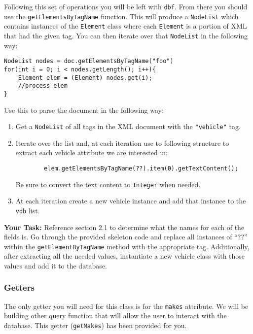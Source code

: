 Following this set of operations you will be left with \lstinline|dbf|. From there
you should use the \lstinline|getElementsByTagName| function. This will produce 
a \lstinline|NodeList| which contains instances of the \lstinline|Element| class
where each \lstinline|Element| is a portion of XML that had the given tag. You
can then iterate over that \lstinline|NodeList| in the following way:

\begin{lstlisting}[frame=trBL, basicstyle=\fontnotesize]
NodeList nodes = doc.getElementsByTagName("foo")
for(int i = 0; i < nodes.getLength(); i++){
    Element elem = (Element) nodes.get(i);
    //process elem
}
\end{lstlisting}

\newpage
Use this to parse the document in the following way:
\begin{enumerate}
    \item Get a \lstinline|NodeList| of all tags in the XML document with the \lstinline|"vehicle"| tag.
    \item Iterate over the list and, at each iteration use to following structure to extract each vehicle attribute we are interested in:
        \begin{lstlisting}
        elem.getElementsByTagName(??).item(0).getTextContent();
        \end{lstlisting}
        Be sure to convert the text content to \lstinline|Integer| when needed.
    \item At each iteration create a new vehicle instance and add that instance to the \lstinline|vdb| list.
\end{enumerate}

\textbf{Your Task:} Reference section 2.1 to determine what the names for each
of the fields is. Go through the provided skeleton code and replace all
instances of ``??'' within the \lstinline|getElementByTagName| method with the
appropriate tag. Additionally, after extracting all the needed values,
instantiate a new vehicle class with those values and add it to the database.

\subsubsection{Getters}

The only getter you will need for this class is for the \lstinline|makes|
attribute. We will be building other query function that will allow the user to
interact with the database. This getter (\lstinline|getMakes|) has been provided for you.

